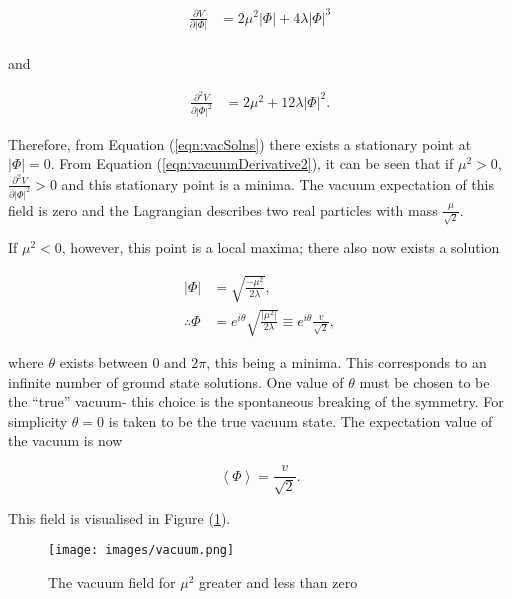 \documentclass{article}
\begin{document}
\begin{equation}
\label{eqn:vacSolns}
\begin{split}
\frac{\partial V}{\partial |\Phi|} & = 2\mu^2|\Phi| + 4\lambda|\Phi|^3 \\
\end{split}
\end{equation}

and

\begin{equation}
\label{eqn:vacuumDerivative2}
\begin{split}
\frac{\partial^2 V}{\partial |\Phi|^2} & = 2\mu^2 + 12\lambda|\Phi|^2.
\end{split}
\end{equation}

Therefore, from Equation (\ref{eqn:vacSolns}) there exists a stationary point at $|\Phi| = 0$. From Equation (\ref{eqn:vacuumDerivative2}), it can be seen that if $\mu^2>0$, $\frac{\partial^2 V}{\partial |\Phi|^2}>0$ and this stationary point is a minima. The vacuum expectation of this field is zero and the Lagrangian describes two real particles with mass $\frac{\mu}{\sqrt{2}}$.

If $\mu^2<0$, however, this point is a local maxima; there also now exists a solution

\begin{equation}
\begin{split}
|\Phi| & = \sqrt{\frac{-\mu^2}{2\lambda}}, \\
\therefore\Phi & = e^{i\theta}\sqrt{\frac{|\mu^2|}{2\lambda}}\equiv e^{i\theta}\frac{v}{\sqrt{2}},
\end{split}
\end{equation}

where $\theta$ exists between $0$ and $2\pi$, this being a minima. This corresponds to an infinite number of ground state solutions. One value of $\theta$ must be chosen to be the ``true'' vacuum- this choice is the spontaneous breaking of the symmetry. For simplicity $\theta = 0$ is taken to be the true vacuum state. The expectation value of the vacuum is now

\begin{equation}
\left< \Phi \right> = \frac{v}{\sqrt{2}}.
\end{equation}

This field is visualised in Figure (\ref{fig:vacuum}).

\begin{figure}
    \centering
    \texttt{[image: images/vacuum.png]}
    \caption{The vacuum field for $\mu^2$ greater and less than zero\label{fig:vacuum}}
\end{figure}
\end{document}
